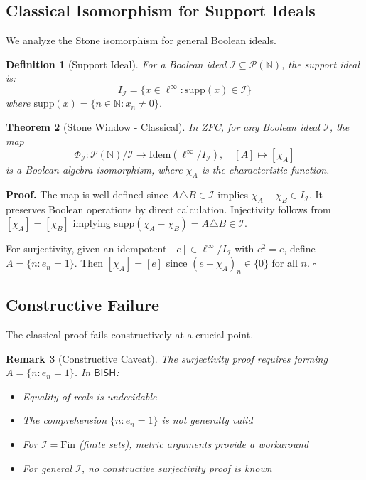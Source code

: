 \documentclass[11pt]{article}
\newtheorem{theorem}{Theorem}[section]
\newtheorem{definition}[theorem]{Definition}
\newtheorem{remark}[theorem]{Remark}
\newenvironment{proof}[1][Proof]{\noindent\textbf{#1.}\hspace{0.5em}}{\hfill$\square$\par}
\newcommand{\N}{\mathbb{N}}
\newcommand{\BISH}{\mathsf{BISH}}
\newcommand{\linf}{\ell^\infty}
\begin{document}
\subsection{Classical Isomorphism for Support Ideals}

We analyze the Stone isomorphism for general Boolean ideals.

\begin{definition}[Support Ideal]
For a Boolean ideal $\mathcal{I} \subseteq \mathcal{P}(\N)$, the \emph{support ideal} is:
\[
I_{\mathcal{I}} = \{x \in \linf : \text{supp}(x) \in \mathcal{I}\}
\]
where $\text{supp}(x) = \{n \in \N : x_n \neq 0\}$.
\end{definition}

\begin{theorem}[Stone Window - Classical]\label{thm:stone-classical}
In ZFC, for any Boolean ideal $\mathcal{I}$, the map
\[
\Phi_{\mathcal{I}}: \mathcal{P}(\N)/\mathcal{I} \to \text{Idem}(\linf/I_{\mathcal{I}}), \quad [A] \mapsto [\chi_A]
\]
is a Boolean algebra isomorphism, where $\chi_A$ is the characteristic function.
\end{theorem}

\begin{proof}
The map is well-defined since $A \triangle B \in \mathcal{I}$ implies $\chi_A - \chi_B \in I_{\mathcal{I}}$. It preserves Boolean operations by direct calculation. Injectivity follows from $[\chi_A] = [\chi_B]$ implying $\text{supp}(\chi_A - \chi_B) = A \triangle B \in \mathcal{I}$.

For surjectivity, given an idempotent $[e] \in \linf/I_{\mathcal{I}}$ with $e^2 = e$, define $A = \{n : e_n = 1\}$. Then $[\chi_A] = [e]$ since $(e - \chi_A)_n \in \{0\}$ for all $n$.
\end{proof}

\subsection{Constructive Failure}

The classical proof fails constructively at a crucial point.

\begin{remark}[Constructive Caveat]
The surjectivity proof requires forming $A = \{n : e_n = 1\}$. In $\BISH$:
\begin{itemize}
\item Equality of reals is undecidable
\item The comprehension $\{n : e_n = 1\}$ is not generally valid
\item For $\mathcal{I} = \text{Fin}$ (finite sets), metric arguments provide a workaround
\item For general $\mathcal{I}$, no constructive surjectivity proof is known
\end{itemize}
\end{remark}
\end{document}
